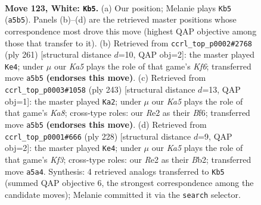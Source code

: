 \documentclass[11pt]{article}
\begin{document}
\clearpage

\begin{figure}[p]\centering
\begin{subfigure}{0.46\textwidth}\centering
\resizebox{\linewidth}{!}{%
\newchessgame
\chessboard[
  setfen={7k/8/7r/K7/1B6/8/4R3/8 w - - 13 123},
  showmover=false,
  pgfstyle=straightmove, color=movearrow, markmove={a5-b5}
]}
\caption{}
\end{subfigure}\hfill
\begin{subfigure}{0.46\textwidth}\centering
\resizebox{\linewidth}{!}{%
\newchessgame
\chessboard[
  setfen={5R2/8/8/8/6b1/5k2/8/4K3 b - - 6 131},
  showmover=false,
  pgfstyle=straightmove, color=movearrow, markmove={f3-e4}
]}
\caption{}
\end{subfigure}
\\[4pt]
\begin{subfigure}{0.46\textwidth}\centering
\resizebox{\linewidth}{!}{%
\newchessgame
\chessboard[
  setfen={8/1R5B/5b2/8/2K3n1/8/8/k7 b - - 84 122},
  showmover=false,
  pgfstyle=straightmove, color=movearrow, markmove={a1-a2}
]}
\caption{}
\end{subfigure}\hfill
\begin{subfigure}{0.46\textwidth}\centering
\resizebox{\linewidth}{!}{%
\newchessgame
\chessboard[
  setfen={8/8/8/2k5/8/5K2/1B2B3/8 w - - 7 115},
  showmover=false,
  pgfstyle=straightmove, color=movearrow, markmove={f3-e4}
]}
\caption{}
\end{subfigure}
\caption{\textbf{Move 123, White: \texttt{Kb5}.} (a) Our position; Melanie plays \texttt{Kb5} (\texttt{a5b5}). Panels (b)--(d) are the retrieved master positions whose correspondence most drove this move (highest QAP objective among those that transfer to it). (b) Retrieved from \texttt{ccrl\_top\_p0002\#2768} (ply 261) [structural distance $d$=10, QAP obj=2]: the master played \texttt{Ke4}; under $\mu$ our \emph{Ka5} plays the role of that game's \emph{Kf6}; transferred move \texttt{a5b5} \textbf{(endorses this move)}. (c) Retrieved from \texttt{ccrl\_top\_p0003\#1058} (ply 243) [structural distance $d$=13, QAP obj=1]: the master played \texttt{Ka2}; under $\mu$ our \emph{Ka5} plays the role of that game's \emph{Ka8}; cross-type roles: our \emph{R}e2 as their \emph{B}f6; transferred move \texttt{a5b5} \textbf{(endorses this move)}. (d) Retrieved from \texttt{ccrl\_top\_p0001\#666} (ply 228) [structural distance $d$=9, QAP obj=2]: the master played \texttt{Ke4}; under $\mu$ our \emph{Ka5} plays the role of that game's \emph{Kf3}; cross-type roles: our \emph{R}e2 as their \emph{B}b2; transferred move \texttt{a5a4}. Synthesis: 4 retrieved analogs transferred to \texttt{Kb5} (summed QAP objective 6, the strongest correspondence among the candidate moves); Melanie committed it via the \texttt{search} selector.}
\label{fig:thought-m244}
\end{figure}
\end{document}
